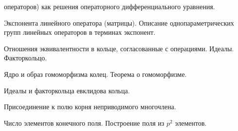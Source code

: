 \documentclass[a4paper]{article}
\begin{document}
\begin{nums}{-1}
      операторов) как решения операторного дифференциального уравнения.
\item Экспонента линейного оператора (матрицы). Описание однопараметрических групп линейных операторов
      в терминах экспонент.
\item Отношения эквивалентности в кольце, согласованные с операциями. Идеалы. Факторкольцо.
\item Ядро и образ гомоморфизма колец. Теорема о гомоморфизме.
\item Идеалы и факторкольца евклидова кольца.
\item Присоединение к полю корня неприводимого многочлена.
\item Число элементов конечного поля. Построение поля из $p^2$ элементов.
\end{nums}

\medskip\dmvntrail
\end{document}
